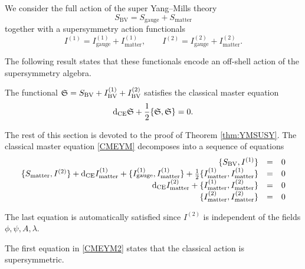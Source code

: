 \documentclass[10pt, oneside]{article}
\newcommand{\BV}{\mathrm{BV}}
\newcommand{\gauge}{\mathrm{gauge}}
\newcommand{\matter}{\mathrm{matter}}
\begin{document}
We consider the full action of the super Yang--Mills theory
\[S_{\BV} = S_{\gauge} + S_{\matter}\]
together with a supersymmetry action functionals
\[I^{(1)} = I^{(1)}_{\gauge} + I^{(1)}_{\matter},\qquad I^{(2)} = I^{(2)}_{\gauge} + I^{(2)}_{\matter}.\]

The following result states that these functionals encode an off-shell action of the supersymmetry algebra.

\begin{thm}
The functional $\fS = S_{\BV} + I_{\BV}^{(1)} + I_{\BV}^{(2)}$ satisfies the classical master equation
\begin{equation}
\label{CMEYM}
{\rm d}_{\mathrm{CE}} \mathfrak S + \frac{1}{2} \{\mathfrak S, \mathfrak S\} = 0 .
\end{equation}
\label{thm:YMSUSY}
\end{thm}

The rest of this section is devoted to the proof of Theorem \ref{thm:YMSUSY}. The classical master equation \eqref{CMEYM} decomposes into a sequence of equations
\begin{equation}
\label{CMEYM2}
\begin{array}{rrrrrr}
\{S_{\BV} , I^{(1)}\} & = & 0 \\ 
\{S_{\matter}, I^{(2)}\} + \d_{\mr{CE}} I_{\matter}^{(1)} + \{I_{\gauge}^{(1)}, I_{\matter}^{(1)}\} + \frac{1}{2} \{I_{\matter}^{(1)}, I_{\matter}^{(1)}\} & = & 0 \\
\d_{\mr{CE}} I_{\matter}^{(2)} + \{I_{\matter}^{(1)}, I_{\matter}^{(2)}\} & =& 0 \\
\{I_{\matter}^{(2)}, I_{\matter}^{(2)}\} & =& 0
\end{array}
\end{equation}

The last equation is automatically satisfied since $I^{(2)}$ is independent of the fields $\phi, \psi, A, \lambda$.

The first equation in \eqref{CMEYM2} states that the classical action is supersymmetric.
\end{document}
